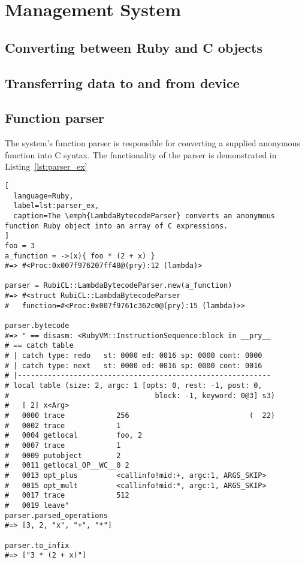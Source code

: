 \section{Management System}

\subsection{Converting between Ruby and C objects}

\subsection{Transferring data to and from device}

\subsection{Function parser}
The system's function parser is responsible for converting a supplied anonymous function into C syntax. The functionality of the parser is demonstrated in Listing~\ref{lst:parser_ex}
\begin{lstlisting}[
  language=Ruby,
  label=lst:parser_ex,
  caption=The \emph{LambdaBytecodeParser} converts an anonymous function Ruby object into an array of C expressions.
]
foo = 3
a_function = ->(x){ foo * (2 + x) }
#=> #<Proc:0x007f976207ff48@(pry):12 (lambda)>

parser = RubiCL::LambdaBytecodeParser.new(a_function)
#=> #<struct RubiCL::LambdaBytecodeParser
#   function=#<Proc:0x007f9761c362c0@(pry):15 (lambda)>>

parser.bytecode
#=> " == disasm: <RubyVM::InstructionSequence:block in __pry__
# == catch table
# | catch type: redo   st: 0000 ed: 0016 sp: 0000 cont: 0000
# | catch type: next   st: 0000 ed: 0016 sp: 0000 cont: 0016
# |-----------------------------------------------------------
# local table (size: 2, argc: 1 [opts: 0, rest: -1, post: 0,
#                                  block: -1, keyword: 0@3] s3)
#   [ 2] x<Arg>     
#   0000 trace            256                            (  22)
#   0002 trace            1
#   0004 getlocal         foo, 2
#   0007 trace            1
#   0009 putobject        2
#   0011 getlocal_OP__WC__0 2
#   0013 opt_plus         <callinfo!mid:+, argc:1, ARGS_SKIP>
#   0015 opt_mult         <callinfo!mid:*, argc:1, ARGS_SKIP>
#   0017 trace            512
#   0019 leave"
parser.parsed_operations
#=> [3, 2, "x", "+", "*"]

parser.to_infix
#=> ["3 * (2 + x)"]
\end{lstlisting}

